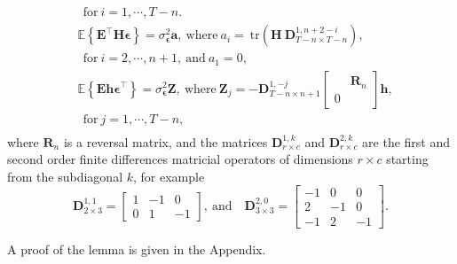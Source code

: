 \begin{lem}{\small}
\begin{equation*}
\begin{aligned}
& \ \ \text{for} \ i = 1,\cdots,T-n . \\
& \mathbb{E} \left\{ \mathbf{E}^\top \mathbf{H} \bm{\epsilon} \right\} = \sigma_{\bm{\epsilon}}^2 \mathbf{a}, \
\text{where} \ a_i = \ \mathrm{tr} \left( \mathbf{H} \ \mathbf{D}_{T-n \times T-n}^{1, n+2-i} \right), \\ & \ \ \text{for} \ i = 2,\cdots,n+1  , \ \text{and} \ a_1 = 0,   \\
& \mathbb{E} \left\{ \mathbf{E} \mathbf{h} \bm{\epsilon}^\top \right\} = \sigma_{\bm{\epsilon}}^2 \mathbf{Z}, \
\text{where} \ \mathbf{Z}_{j} = -\mathbf{D}_{T-n \times n+1}^{1,-j} \begin{bmatrix} & \mathbf{R}_n \\ 0 \end{bmatrix} \mathbf{h} ,  \\ 
& \ \ \text{for} \ j = 1,\cdots,T-n ,\\
\end{aligned} \end{equation*} 
where $\mathbf{R}_n$ is a reversal matrix, and the matrices
$\mathbf{D}_{r \times c}^{1,k}$ and $\mathbf{D}_{r \times c}^{2,k}$  are the first and second order finite differences matricial operators of dimensions $r \times c$  starting from the subdiagonal $k$, for example \begin{equation*} 
\mathbf{D}_{2 \times 3}^{1,1} = \begin{bmatrix} 1 & -1 & 0 \\ 0 & 1 & -1 \end{bmatrix}, \ \text{and} \quad \mathbf{D}_{3 \times 3}^{2,0} = \begin{bmatrix}-1 & 0 & 0 \\ 2 & -1 & 0 \\ - 1 & 2 & -1  \end{bmatrix} .
\end{equation*} 
\end{lem}

\normalsize

A proof of the lemma is given in the Appendix.

